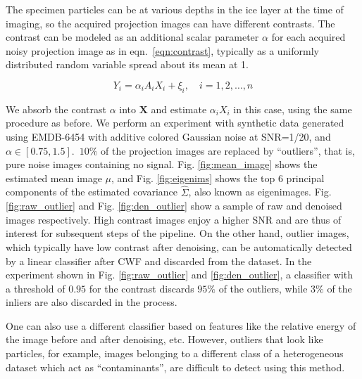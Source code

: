 The specimen particles can be at various depths in the ice layer at the time of imaging, so the acquired
projection images can have different contrasts. The contrast can be modeled
as an additional scalar parameter $\alpha$ for each acquired noisy projection image as in eqn.\ \ref{eqn:contrast},
typically as a uniformly distributed random variable spread about its mean at 1.


\begin{equation}
 Y_i = \alpha_i A_i X_i + \xi_i, \quad i=1,2,\ldots,n
\label{eqn:contrast}
\end{equation}

We absorb the contrast $\alpha$ into $\textbf{X}$ and estimate $\alpha_i X_i$ in this case, using the same procedure as before.
We perform an experiment with synthetic data generated using EMDB-6454 with additive colored Gaussian noise at SNR=1/20, and $\alpha \in [0.75,1.5]$.\ $10\%$ of the
projection images are replaced by ``outliers'', that is, pure noise images containing no signal. 
Fig. \ref{fig:mean_image} shows the estimated mean image $\mu$, and Fig. \ref{fig:eigenims} shows the top 6 principal components
of the estimated covariance $\hat\Sigma$, also known as eigenimages. Fig. \ref{fig:raw_outlier} and Fig. \ref{fig:den_outlier} show 
a sample of raw and denoised images respectively. High contrast images enjoy a higher 
SNR and are thus of interest for subsequent steps of the pipeline. On the other hand, outlier images, which typically have low contrast
after denoising, can be automatically detected by a linear classifier
after CWF and discarded from the dataset. In the experiment shown in Fig. \ref{fig:raw_outlier} and \ref{fig:den_outlier}, a classifier
with a threshold of $0.95$ for the contrast discards $95\%$ of the outliers, while $3\%$ of the inliers are also discarded
in the process.

One can also use a different classifier based on features like the relative energy of the image before and after denoising, etc.
However, outliers that look like particles, for example, images belonging to a different class of a heterogeneous dataset which act as ``contaminants'',
are difficult to detect using this method.

